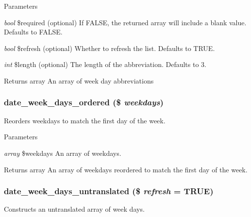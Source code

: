 \begin{DoxyParams}{Parameters}
\item[{\em bool}]\$required (optional) If FALSE, the returned array will include a blank value. Defaults to FALSE. \item[{\em bool}]\$refresh (optional) Whether to refresh the list. Defaults to TRUE. \item[{\em int}]\$length (optional) The length of the abbreviation. Defaults to 3.\end{DoxyParams}
\begin{DoxyReturn}{Returns}
array An array of week day abbreviations 
\end{DoxyReturn}
\hypertarget{date__api_8module_a80ff7d0168bb360389773fa867f8e210}{
\subsubsection[{date\_\-week\_\-days\_\-ordered}]{\setlength{\rightskip}{0pt plus 5cm}date\_\-week\_\-days\_\-ordered (\$ {\em weekdays})}}
\label{date__api_8module_a80ff7d0168bb360389773fa867f8e210}
Reorders weekdays to match the first day of the week.


\begin{DoxyParams}{Parameters}
\item[{\em array}]\$weekdays An array of weekdays.\end{DoxyParams}
\begin{DoxyReturn}{Returns}
array An array of weekdays reordered to match the first day of the week. 
\end{DoxyReturn}
\hypertarget{date__api_8module_a56d0686e065492539b9caa2e6d6dd5ed}{
\subsubsection[{date\_\-week\_\-days\_\-untranslated}]{\setlength{\rightskip}{0pt plus 5cm}date\_\-week\_\-days\_\-untranslated (\$ {\em refresh} = {\ttfamily TRUE})}}
\label{date__api_8module_a56d0686e065492539b9caa2e6d6dd5ed}
Constructs an untranslated array of week days.

